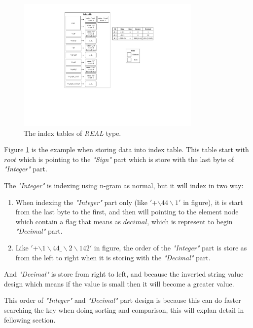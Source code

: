 \begin{figure}[h]
\centering
\includegraphics[width=0.8\textwidth]{./algorithm/real/pic/design/example_v4.pdf}
\caption{The index tables of \textit{REAL} type.}
\label{fig:algorithm:real:example}
\end{figure}

Figure \ref{fig:algorithm:real:example} is the example when storing data into index table. This table start with $root$ which is pointing to the \textit{"Sign"} part which is store with the last byte of \textit{"Integer"} part.

The \textit{"Integer"} is indexing using n-gram as normal, but it will index in two way:

\begin{enumerate}

\item When indexing the \textit{"Integer"} part only (like $'$+$\backslash44\backslash1'$ in figure), it is start from the last byte to the first, and then will pointing to the element node which contain a flag that means as $decimal$, which is represent to begin \textit{"Decimal"} part.

\item Like $'$+$\backslash1\backslash44\_\backslash2\backslash142'$ in figure, the order of the \textit{"Integer"} part is store as from the left to right when it is storing with the \textit{"Decimal"} part.

\end{enumerate}

And \textit{"Decimal"} is store from right to left, and because the inverted string value design which means if the value is small then it will become a greater value.

This order of \textit{"Integer"} and \textit{"Decimal"} part design is because this can do faster searching the key when doing sorting and comparison, this will explan detail in fellowing section.











\clearpage

